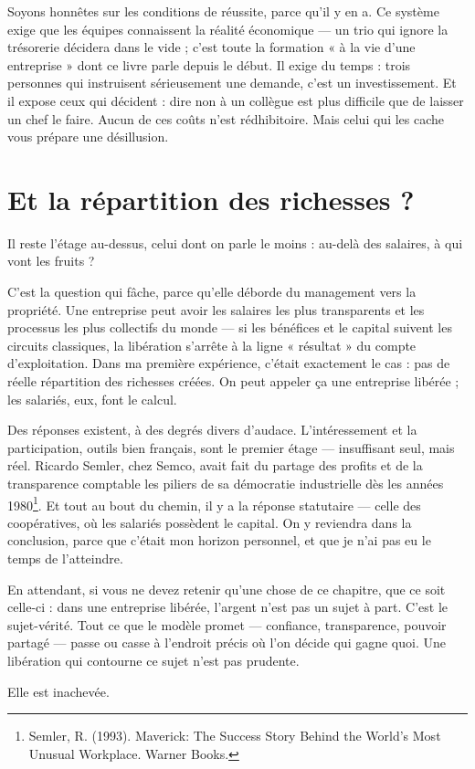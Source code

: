 Soyons honnêtes sur les conditions de réussite, parce qu'il y en a. Ce système exige que les équipes connaissent la réalité économique — un trio qui ignore la trésorerie décidera dans le vide ; c'est toute la formation « à la vie d'une entreprise » dont ce livre parle depuis le début. Il exige du temps : trois personnes qui instruisent sérieusement une demande, c'est un investissement. Et il expose ceux qui décident : dire non à un collègue est plus difficile que de laisser un chef le faire. Aucun de ces coûts n'est rédhibitoire. Mais celui qui les cache vous prépare une désillusion.

\section{Et la répartition des richesses ?}

Il reste l'étage au-dessus, celui dont on parle le moins : au-delà des salaires, à qui vont les fruits ?

C'est la question qui fâche, parce qu'elle déborde du management vers la propriété. Une entreprise peut avoir les salaires les plus transparents et les processus les plus collectifs du monde — si les bénéfices et le capital suivent les circuits classiques, la libération s'arrête à la ligne « résultat » du compte d'exploitation. Dans ma première expérience, c'était exactement le cas : pas de réelle répartition des richesses créées. On peut appeler ça une entreprise libérée ; les salariés, eux, font le calcul.

Des réponses existent, à des degrés divers d'audace. L'intéressement et la participation, outils bien français, sont le premier étage — insuffisant seul, mais réel. Ricardo Semler, chez Semco, avait fait du partage des profits et de la transparence comptable les piliers de sa démocratie industrielle dès les années 1980\footnote{Semler, R. (1993). Maverick: The Success Story Behind the World's Most Unusual Workplace. Warner Books.}. Et tout au bout du chemin, il y a la réponse statutaire — celle des coopératives, où les salariés possèdent le capital. On y reviendra dans la conclusion, parce que c'était mon horizon personnel, et que je n'ai pas eu le temps de l'atteindre.

En attendant, si vous ne devez retenir qu'une chose de ce chapitre, que ce soit celle-ci : dans une entreprise libérée, l'argent n'est pas un sujet à part. C'est le sujet-vérité. Tout ce que le modèle promet — confiance, transparence, pouvoir partagé — passe ou casse à l'endroit précis où l'on décide qui gagne quoi. Une libération qui contourne ce sujet n'est pas prudente.

Elle est inachevée.
